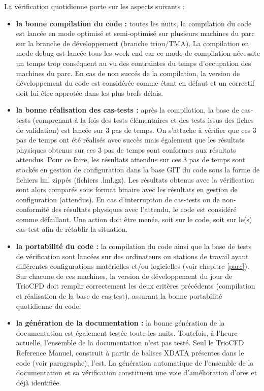 La v\'erification quotidienne porte sur les aspects suivants :\newline
\begin{itemize}[label=$\Rightarrow$, font=\LARGE]
  \item \textbf{la bonne compilation du code :} toutes les nuits, la compilation du code est lanc\'ee en mode optimis\'e et semi-optimis\'e sur plusieurs machines du parc sur la branche de d\'eveloppement (branche triou/TMA). La compilation en mode debug est lanc\'ee tous les week-end car ce mode de compilation n\'ecessite un temps trop cons\'equent au vu des contraintes du temps d'occupation des machines du parc. En cas de non succ\'es de la compilation, la version de d\'eveloppement du code est consid\'er\'ee comme \'etant en d\'efaut et un correctif doit lui \^etre approt\'ee dans les plus brefs d\'elais.
  \item \textbf{la bonne r\'ealisation des cas-tests :} apr\`es la compilation, la base de cas-tests (comprenant \`a la fois des tests \'el\'ementaires et des tests issus des fiches de validation) est lanc\'ee sur 3 pas de temps. On s'attache \`a v\'erifier que ces 3 pas de temps ont \'et\'e r\'ealis\'es avec succ\`es mais \'egalement que les r\'esultats physiques obtenus sur ces 3 pas de temps sont conformes aux r\'esultats attendus. Pour ce faire, les r\'esultats   attendus sur ces 3 pas de temps sont stock\'es en gestion de configuration dans la base GIT du code sous la forme de fichiers lml zipp\'es (fichiers .lml.gz). Les r\'esultats obtenus avec la v\'erification sont alors compar\'es sous format binaire avec les r\'esultats en gestion de configuration (attendus). En cas d'interruption de cas-tests ou de non-conformit\'e des r\'esultats physiques avec l'attendu, le code est consid\'er\'e comme d\'efaillant. Une action doit \^etre men\'ee, soit sur le code, soit sur le(s) cas-test afin de r\'etablir la situation. 
  \item \textbf{la portabilit\'e du code :} la compilation du code ainsi que la base de tests de v\'erification sont lanc\'ees sur des ordinateurs ou stations de travail ayant diff\'erentes configurations mat\'erielles et/ou logicielles (voir chapitre \ref{parc}). Sur chacune de ces machines, la version de d\'eveloppement du jour de TrioCFD doit remplir correctement les deux crit\`eres pr\'ec\'edents (compilation et r\'ealisation de la base de cas-test), assurant la bonne portabilit\'e quotidienne du code.
  \item \textbf{la g\'en\'eration de la documentation :} la bonne g\'en\'eration de la documentation est \'egalement test\'ee toute les nuits. Toutefois, \`a l'heure actuelle, l'ensemble de la documentation n'est pas test\'e. Seul le TrioCFD Reference Manuel, construit \`a partir de balises XDATA pr\'esentes dans le code (voir paragraphe), l'est. La g\'en\'eration automatique de l'ensemble de la documentation et sa vérification constituent une voie d'am\'elioration d'ores et déjà identifiée.
\end{itemize}\smallskip

